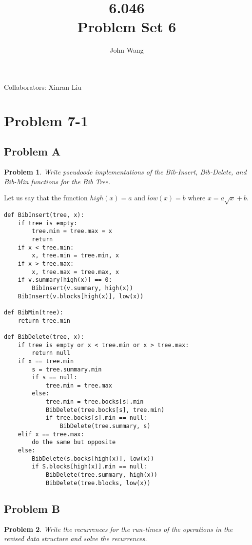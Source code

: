 \documentclass[psamsfonts]{amsart}
\title{6.046 \\
Problem Set 6}
\author{John Wang}
\newtheorem{prob}{Problem}[section]
\newenvironment{sol}{{\bfseries Solution}}{\qedsymbol}
\theoremstyle{definition}
\theoremstyle{remark}
\numberwithin{equation}{section}
\begin{document}
\maketitle

Collaborators: Xinran Liu

\section{Problem 7-1}

\subsection{Problem A}

\begin{prob}
Write pseudoode implementations of the Bib-Insert, Bib-Delete, and Bib-Min functions for the Bib Tree.
\end{prob}

\begin{sol}

Let us say that the function $high(x) = a$ and $low(x) = b$ where $x = a \sqrt{x} + b$. 

\begin{verbatim}
def BibInsert(tree, x):
    if tree is empty:
        tree.min = tree.max = x
        return
    if x < tree.min:
        x, tree.min = tree.min, x
    if x > tree.max:
        x, tree.max = tree.max, x
    if v.summary[high(x)] == 0:
        BibInsert(v.summary, high(x))
    BibInsert(v.blocks[high(x)], low(x))

def BibMin(tree):
    return tree.min

def BibDelete(tree, x):
    if tree is empty or x < tree.min or x > tree.max:
        return null
    if x == tree.min
        s = tree.summary.min
        if s == null: 
            tree.min = tree.max
        else:
            tree.min = tree.bocks[s].min
            BibDelete(tree.bocks[s], tree.min)
            if tree.bocks[s].min == null:
                BibDelete(tree.summary, s)
    elif x == tree.max:
        do the same but opposite
    else:
        BibDelete(s.bocks[high(x)], low(x))
        if S.blocks[high(x)].min == null:
            BibDelete(tree.summary, high(x))
            BibDelete(tree.blocks, low(x))
\end{verbatim}
\end{sol}

\subsection{Problem B}

\begin{prob}
Write the recurrences for the run-times of the operations in the revised data structure and solve the recurrences.
\end{prob}

\begin{sol}

\end{sol}
\end{document}
